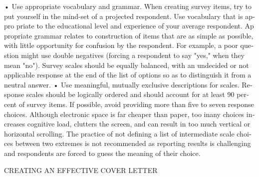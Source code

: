 \documentclass[a4 paper,12pt]{article}\usepackage{xepersian}
\begin{document}
\begin{latin}
  

\vspace{0.1cm}

\vspace{0.1cm}


\vspace{0.1cm}

\vspace{0.1cm}


\vspace{0.1cm}
\vspace{0.1cm}
\vspace{0.1cm}

• Use appropriate vocabulary and grammar. When creating survey items, try to put 
yourself in the mind-set of a projected respondent. Use vocabulary that is appro priate to the educational level and experience of your average respondent. Ap propriate grammar relates to construction of items that are as simple as possible, with little opportunity for confusion by the respondent. For example, a poor question might use double negatives (forcing a respondent to say "yes," when they mean "no"). Survey scales should be equally balanced, with an undecided or not applicable response at the end of the list of options so as to distinguish it from 
a neutral answer. 
• Use meaningful, mutually exclusive descriptions for scales. Response scales should be 
logically ordered and should account for at least 90 percent of survey items. If possible, avoid providing more than five to seven response choices. Although electronic space is far cheaper than paper, too inany choices increases cognitive load, clutters the screen, and can result in too much vertical or horizontal scrolling. The practice of not defining a list of intermediate scale choices between two extremes is not recommended as reporting results is challenging and respondents are forced to guess the meaning of their choice. 

\noindent
 CREATING AN EFFECTIVE COVER LETTER 
\vspace{0.1cm}


\end{latin}
\end{document}
